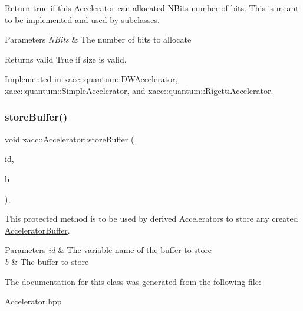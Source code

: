 Return true if this \hyperlink{a01613}{Accelerator} can allocated N\+Bits number of bits. This is meant to be implemented and used by subclasses.


\begin{DoxyParams}{Parameters}
{\em N\+Bits} & The number of bits to allocate \\
\hline
\end{DoxyParams}
\begin{DoxyReturn}{Returns}
valid True if size is valid. 
\end{DoxyReturn}


Implemented in \hyperlink{a01133_a4c2ee30212a919d8ddf7f9555df25195}{xacc\+::quantum\+::\+D\+W\+Accelerator}, \hyperlink{a01185_a60b9db2d6aed235857c45413a070338e}{xacc\+::quantum\+::\+Simple\+Accelerator}, and \hyperlink{a01165_a61352c07062597aad2393fbeed4cc025}{xacc\+::quantum\+::\+Rigetti\+Accelerator}.

\mbox{\label{a01613_ac3e781f42ec25e460174d4c41ea26b94}} 
\subsubsection{\texorpdfstring{store\+Buffer()}{storeBuffer()}}
{\footnotesize\ttfamily void xacc\+::\+Accelerator\+::store\+Buffer (\begin{DoxyParamCaption}\item[{const std\+::string \&}]{id,  }\item[{std\+::shared\+\_\+ptr$<$ \hyperlink{a01625}{Accelerator\+Buffer} $>$}]{b }\end{DoxyParamCaption})\hspace{0.3cm}{\ttfamily [inline]}, {\ttfamily [protected]}}

This protected method is to be used by derived Accelerators to store any created \hyperlink{a01625}{Accelerator\+Buffer}.


\begin{DoxyParams}{Parameters}
{\em id} & The variable name of the buffer to store \\
\hline
{\em b} & The buffer to store \\
\hline
\end{DoxyParams}


The documentation for this class was generated from the following file\+:\begin{DoxyCompactItemize}
\item 
Accelerator.\+hpp\end{DoxyCompactItemize}
